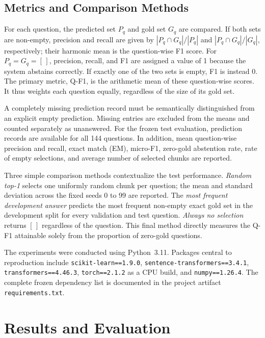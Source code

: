 \documentclass[11pt]{article}
\begin{document}
\subsection{Metrics and Comparison Methods}

For each question, the predicted set $P_q$ and gold set $G_q$ are compared. If both sets are non-empty, precision and recall are given by $|P_q\cap G_q|/|P_q|$ and $|P_q\cap G_q|/|G_q|$, respectively; their harmonic mean is the question-wise F1 score. For $P_q=G_q=[\,]$, precision, recall, and F1 are assigned a value of 1 because the system abstains correctly. If exactly one of the two sets is empty, F1 is instead 0. The primary metric, Q-F1, is the arithmetic mean of these question-wise scores. It thus weights each question equally, regardless of the size of its gold set.

A completely missing prediction record must be semantically distinguished from an explicit empty prediction. Missing entries are excluded from the means and counted separately as unanswered. For the frozen test evaluation, prediction records are available for all 144 questions. In addition, mean question-wise precision and recall, exact match (EM), micro-F1, zero-gold abstention rate, rate of empty selections, and average number of selected chunks are reported.

Three simple comparison methods contextualize the test performance. \emph{Random top-1} selects one uniformly random chunk per question; the mean and standard deviation across the fixed seeds 0 to 99 are reported. The \emph{most frequent development answer} predicts the most frequent non-empty exact gold set in the development split for every validation and test question. \emph{Always no selection} returns $[\,]$ regardless of the question. This final method directly measures the Q-F1 attainable solely from the proportion of zero-gold questions.

The experiments were conducted using Python~3.11. Packages central to reproduction include \texttt{scikit-learn==1.9.0}, \texttt{sentence-transformers==3.4.1}, \texttt{transformers==4.46.3}, \texttt{torch==2.1.2} as a CPU build, and \texttt{numpy==1.26.4}. The complete frozen dependency list is documented in the project artifact \texttt{requirements.txt}.


\section{Results and Evaluation}
\end{document}
